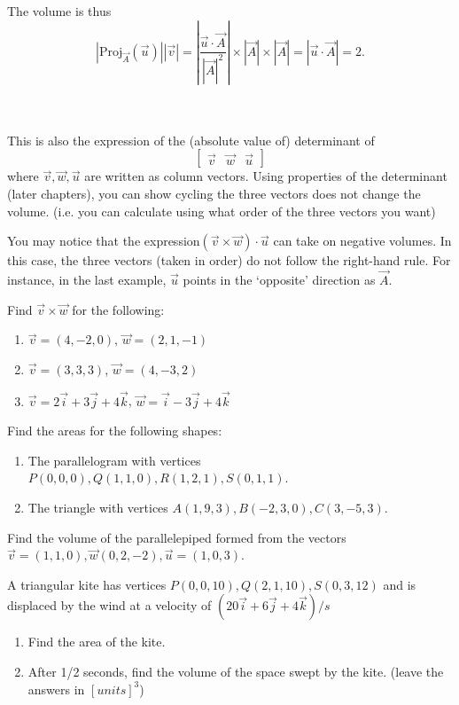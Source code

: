 The volume is thus \[
	|\textrm{Proj}_{\vec{A}}(\vec{u})||\vec{v}|=|\frac{\vec{u}\cdot\vec{A}}{|\vec{A}|^2}|\times |\vec{A}| \times|\vec{A}| = |\vec{u}\cdot\vec{A}| = 2.
\]\ \\

\ \\

\begin{remark}
	This is also the expression of the (absolute value of) determinant of \[
	\begin{bmatrix}
		\vec{v}&\vec{w}&\vec{u}
	\end{bmatrix}
	\]
	where $\vec{v},\vec{w},\vec{u}$ are written as column vectors.
	Using properties of the determinant (later chapters), you can show cycling the three vectors does not change the volume. (i.e. you can calculate using what order of the three vectors you want)
\end{remark}
	
\begin{remark}
	You may notice that the expression$(\vec{v}\times\vec{w})\cdot{\vec{u}}$ can take on negative volumes. In this case, the three vectors (taken in order) do not follow the right-hand rule. For instance, in the last example, $\vec{u}$ points in the `opposite' direction as $\vec{A}$.
\end{remark}
\exercises
\begin{exerciselist}
	\item Find $\vec{v}\times\vec{w}$ for the following: \begin{enumerate}[label=(\alph*)]
		\item $\vec{v}=(4,-2,0)$, $\vec{w}=(2,1,-1)$
		\item $\vec{v}=(3,3,3)$, $\vec{w}=(4,-3,2)$
		\item $\vec{v}=2\vec{i}+3\vec{j}+4\vec{k}$, $\vec{w}=\vec{i}-3\vec{j}+4\vec{k}$
	\end{enumerate}
	\item Find the areas for the following shapes:\begin{enumerate}[label=(\alph*)]
		\item The parallelogram with vertices $P(0,0,0), Q(1,1,0),R(1,2,1),S(0,1,1)$.
		\item The triangle with vertices $A(1,9,3),B(-2,3,0),C(3,-5,3)$.
	\end{enumerate}
	\item Find the volume of the parallelepiped formed from the vectors $\vec{v}=(1,1,0),\vec{w}(0,2,-2),\vec{u}=(1,0,3)$.
	\item A triangular kite has vertices $P(0,0,10),Q(2,1,10),S(0,3,12)$ and is displaced by the wind at a velocity of $(20\vec{i}+6\vec{j}+4\vec{k})/s$\begin{enumerate}[label=(\alph*)]
		\item Find the area of the kite.
		\item After 1/2 seconds, find the volume of the space swept by the kite. (leave the answers in $[units]^3$)
	\end{enumerate}
\end{exerciselist}

